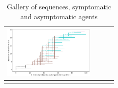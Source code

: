 \documentclass[graybox]{svmult}
\begin{document}
\begin{table}
\begin{tabular}{cccc}
 \includegraphics[width=12em]{sequences/withShort2.png} %
\\
 \hline\noalign{\smallskip}
 \end{tabular}
 \caption{Gallery of sequences, symptomatic and asymptomatic agents}
 \label{gallery}
 \end{table}






\end{document}
